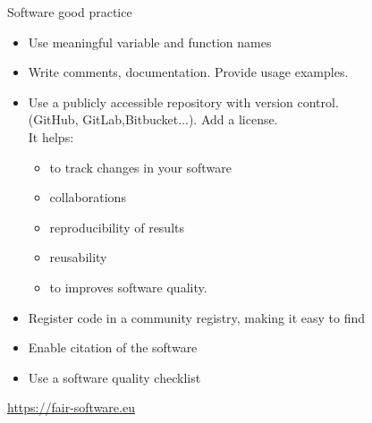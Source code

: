 \documentclass[ignorenonframetext,aspectratio=169,10pt,xcolor=table]{beamer}
\begin{document}
\begin{frame}{Software good practice} 

\begin{itemize}
	\item Use meaningful variable and function names
	\item Write comments, documentation. Provide usage examples.
	\item Use a publicly accessible repository with version control. \\
	 (GitHub, GitLab,Bitbucket...). Add a license.\\
	It helps: 
	\begin{itemize}
	\item to track changes in your software
	\item collaborations 
	\item reproducibility of results 
	\item reusability
	\item to improves software quality. 
	\end{itemize}


	\item Register code in a community registry, making it easy to find
	\item Enable citation of the software 
	\item Use a software quality checklist
\end{itemize}

\vspace{1cm}
\begin{flushright}
{\tiny \url{https://fair-software.eu}}
\end{flushright}
\end{frame}
\end{document}

